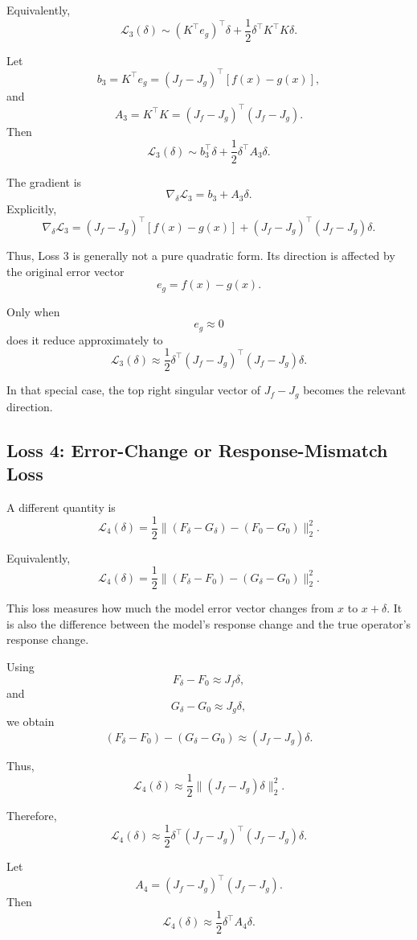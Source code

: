 \documentclass{article}
\begin{document}
Equivalently,
\[
    \mathcal{L}_3(\delta)
    \sim
    (K^\top e_g)^\top \delta
    +
    \frac{1}{2}\delta^\top K^\top K\delta.
\]

Let
\[
    b_3 = K^\top e_g
    =
    (J_f-J_g)^\top [f(x)-g(x)],
\]
and
\[
    A_3 = K^\top K
    =
    (J_f-J_g)^\top(J_f-J_g).
\]
Then
\[
    \mathcal{L}_3(\delta)
    \sim
    b_3^\top \delta
    +
    \frac{1}{2}\delta^\top A_3\delta.
\]

The gradient is
\[
    \nabla_\delta \mathcal{L}_3
    =
    b_3+A_3\delta.
\]
Explicitly,
\[
    \nabla_\delta \mathcal{L}_3
    =
    (J_f-J_g)^\top [f(x)-g(x)]
    +
    (J_f-J_g)^\top(J_f-J_g)\delta.
\]

Thus, Loss 3 is generally not a pure quadratic form. Its direction is affected by the original error vector
\[
    e_g=f(x)-g(x).
\]

Only when
\[
    e_g\approx 0
\]
does it reduce approximately to
\[
    \mathcal{L}_3(\delta)
    \approx
    \frac{1}{2}\delta^\top
    (J_f-J_g)^\top(J_f-J_g)\delta.
\]

In that special case, the top right singular vector of \(J_f-J_g\) becomes the relevant direction.

\subsection{Loss 4: Error-Change or Response-Mismatch Loss}

A different quantity is
\[
    \mathcal{L}_4(\delta)
    =
    \frac{1}{2}
    \|(F_\delta-G_\delta)-(F_0-G_0)\|_2^2.
\]

Equivalently,
\[
    \mathcal{L}_4(\delta)
    =
    \frac{1}{2}
    \|(F_\delta-F_0)-(G_\delta-G_0)\|_2^2.
\]

This loss measures how much the model error vector changes from \(x\) to \(x+\delta\). It is also the difference between the model's response change and the true operator's response change.

Using
\[
    F_\delta-F_0 \approx J_f\delta,
\]
and
\[
    G_\delta-G_0 \approx J_g\delta,
\]
we obtain
\[
    (F_\delta-F_0)-(G_\delta-G_0)
    \approx
    (J_f-J_g)\delta.
\]

Thus,
\[
    \mathcal{L}_4(\delta)
    \approx
    \frac{1}{2}\|(J_f-J_g)\delta\|_2^2.
\]

Therefore,
\[
    \mathcal{L}_4(\delta)
    \approx
    \frac{1}{2}\delta^\top
    (J_f-J_g)^\top(J_f-J_g)\delta.
\]

Let
\[
    A_4=(J_f-J_g)^\top(J_f-J_g).
\]
Then
\[
    \mathcal{L}_4(\delta)
    \approx
    \frac{1}{2}\delta^\top A_4\delta.
\]
\end{document}
